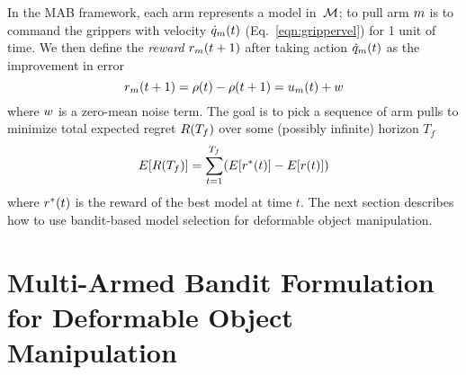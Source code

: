 In the MAB framework, each arm represents a model in~$\mathcal{M}$; to pull arm $m$ is to command the grippers with velocity $\dot{q}_m(t)$ (Eq.~\ref{eqn:grippervel}) for 1 unit of time. We then define the \textit{reward} $r_m(t+1)$ after taking action $\dot{q}_m(t)$ as the improvement in error
\begin{equation}
    r_m(t+1) = \rho(t) - \rho(t+1) = u_m(t) + w
    \label{eqn:observedreward}
\end{equation}
where $w$ is a zero-mean noise term. The goal is to pick a sequence of arm pulls to minimize total expected regret $R(T_f)$ over some (possibly infinite) horizon $T_f$
\begin{equation}
    E[R(T_f)] = \sum_{t=1}^{T_f} (E[r^*(t)] - E[r(t)])
    \label{eqn:totalregret}
\end{equation}
where $r^*(t)$ is the reward of the best model at time $t$. The next section describes how to use bandit-based model selection for deformable object manipulation.


\section{Multi-Armed Bandit Formulation for Deformable Object Manipulation}


